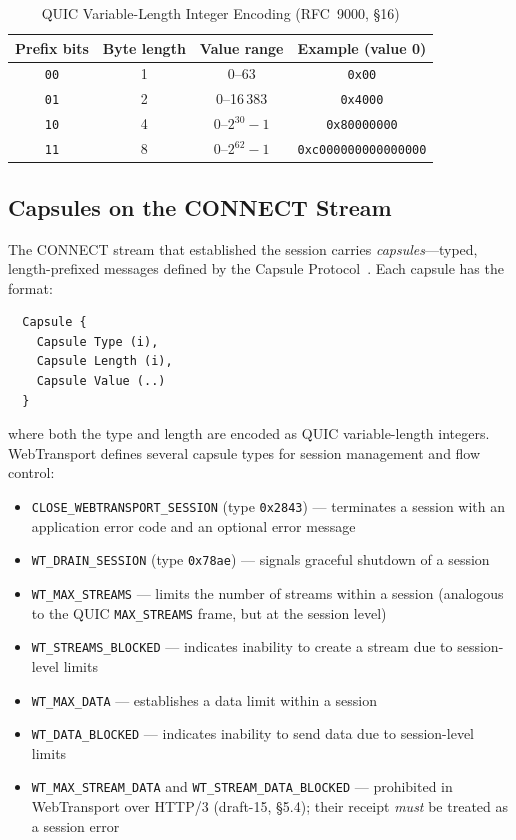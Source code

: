 \begin{table}[ht]
\centering
\caption{QUIC Variable-Length Integer Encoding (RFC~9000, \S16)}
\label{tab:varint-encoding}
\begin{tabular}{cccc}
\hline
\textbf{Prefix bits} & \textbf{Byte length} & \textbf{Value range} & \textbf{Example (value 0)} \\
\hline
\texttt{00} & 1 & 0--63 & \texttt{0x00} \\
\texttt{01} & 2 & 0--16\,383 & \texttt{0x4000} \\
\texttt{10} & 4 & 0--$2^{30}-1$ & \texttt{0x80000000} \\
\texttt{11} & 8 & 0--$2^{62}-1$ & \texttt{0xc000000000000000} \\
\hline
\end{tabular}
\end{table}

\subsection{Capsules on the CONNECT Stream}
\label{sec:capsules}

The CONNECT stream that established the session carries \emph{capsules}---typed, length-prefixed messages defined by the Capsule Protocol~\cite{RFC9297}. Each capsule has the format:

\begin{verbatim}
  Capsule {
    Capsule Type (i),
    Capsule Length (i),
    Capsule Value (..)
  }
\end{verbatim}

\noindent where both the type and length are encoded as QUIC variable-length integers. WebTransport defines several capsule types for session management and flow control:

\begin{itemize}
    \item \texttt{CLOSE\_WEBTRANSPORT\_SESSION} (type \texttt{0x2843}) --- terminates a session with an application error code and an optional error message
    \item \texttt{WT\_DRAIN\_SESSION} (type \texttt{0x78ae}) --- signals graceful shutdown of a session
    \item \texttt{WT\_MAX\_STREAMS} --- limits the number of streams within a session (analogous to the QUIC \texttt{MAX\_STREAMS} frame, but at the session level)
    \item \texttt{WT\_STREAMS\_BLOCKED} --- indicates inability to create a stream due to session-level limits
    \item \texttt{WT\_MAX\_DATA} --- establishes a data limit within a session
    \item \texttt{WT\_DATA\_BLOCKED} --- indicates inability to send data due to session-level limits
    \item \texttt{WT\_MAX\_STREAM\-\_DATA} and \texttt{WT\_STREAM\-\_DATA\-\_BLOCKED} --- prohibited in WebTransport over HTTP/3 (draft-15, \S5.4); their receipt \emph{must} be treated as a session error
\end{itemize}

